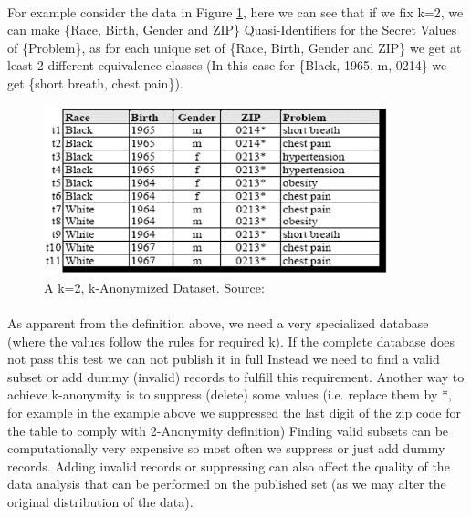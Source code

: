 \documentclass[12pt]{report}
\theoremstyle{named}
\begin{document}
\paragraph{}
For example consider the data in Figure \ref{fig:kAon=2}, here we can see that if we fix k=2, we can make \{Race, Birth, Gender and ZIP\} Quasi-Identifiers for the Secret Values of \{Problem\}, as for each unique set of \{Race, Birth, Gender and ZIP\} we get at least 2 different equivalence classes (In this case for \{Black, 1965, m, 0214\} we get \{short breath, chest pain\}).
\begin{figure}[ht]
\centering
        \includegraphics[width=100mm,scale=0.5]{Images/k2Diversified.png}
    \caption{A k=2, k-Anonymized Dataset. Source:\cite{sweeney2002k}}
    \label{fig:kAon=2}
\end{figure}

\paragraph{}
As apparent from the definition above, we need a very specialized database (where the values follow the rules for required k). If the complete database does not pass this test we can not publish it in full Instead we need to find a valid subset or add dummy (invalid) records to fulfill this requirement. Another way to achieve k-anonymity is to suppress (delete) some values (i.e. replace them by *, for example in the example above we suppressed the last digit of the zip code for the table to comply with 2-Anonymity definition) Finding valid subsets can be computationally very expensive so most often we suppress or just add dummy records. Adding invalid records or suppressing can also affect the quality of the data analysis that can be performed on the published set (as we may alter the original distribution of the data).
\end{document}
